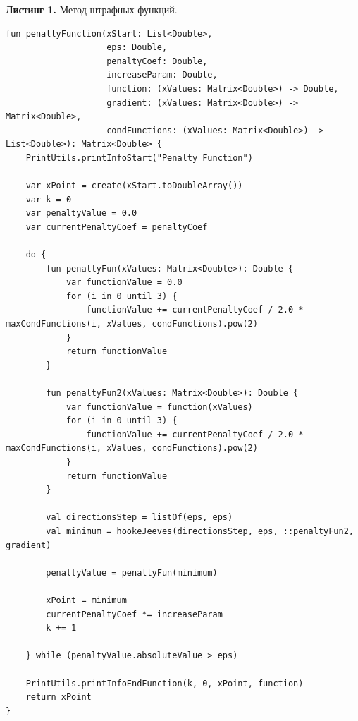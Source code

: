 \documentclass[a4paper, 12pt]{article}   	%
\begin{document}
    \textbf{Листинг 1.} Метод штрафных функций.
    \begin{verbatim}
fun penaltyFunction(xStart: List<Double>,
                    eps: Double,
                    penaltyCoef: Double,
                    increaseParam: Double,
                    function: (xValues: Matrix<Double>) -> Double,
                    gradient: (xValues: Matrix<Double>) -> Matrix<Double>,
                    condFunctions: (xValues: Matrix<Double>) -> List<Double>): Matrix<Double> {
    PrintUtils.printInfoStart("Penalty Function")

    var xPoint = create(xStart.toDoubleArray())
    var k = 0
    var penaltyValue = 0.0
    var currentPenaltyCoef = penaltyCoef

    do {
        fun penaltyFun(xValues: Matrix<Double>): Double {
            var functionValue = 0.0
            for (i in 0 until 3) {
                functionValue += currentPenaltyCoef / 2.0 * maxCondFunctions(i, xValues, condFunctions).pow(2)
            }
            return functionValue
        }

        fun penaltyFun2(xValues: Matrix<Double>): Double {
            var functionValue = function(xValues)
            for (i in 0 until 3) {
                functionValue += currentPenaltyCoef / 2.0 * maxCondFunctions(i, xValues, condFunctions).pow(2)
            }
            return functionValue
        }

        val directionsStep = listOf(eps, eps)
        val minimum = hookeJeeves(directionsStep, eps, ::penaltyFun2, gradient)

        penaltyValue = penaltyFun(minimum)

        xPoint = minimum
        currentPenaltyCoef *= increaseParam
        k += 1

    } while (penaltyValue.absoluteValue > eps)

    PrintUtils.printInfoEndFunction(k, 0, xPoint, function)
    return xPoint
}   
    \end{verbatim}
\end{document}
